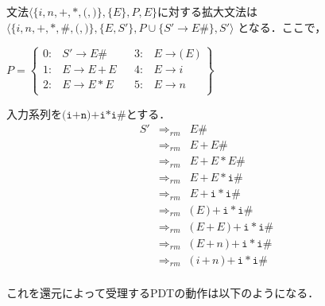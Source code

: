 \documentclass[dvipdfmx,a4j]{jbook}
\begin{document}
\begin{Exmp}
  文法$\langle\{i,n,\texttt{+},\texttt{*},\texttt{(},\texttt{)}\},\{E\},P,E\}$に対する拡大文法は
  $\langle\{i,n,\texttt{+},\texttt{*},\texttt{\#},\texttt{(},\texttt{)}\},\{E,S'\},P\cup\{S'\rightarrow E\texttt{\#}\},S'\rangle$
  となる．ここで，
  
  $P=\left\{\begin{array}{rlcrl}
    0: & S'\rightarrow E\texttt{\#} & & 3: & E\rightarrow \texttt{(}\,E\,\texttt{)}\\
    1: & E\rightarrow E\,\texttt{+}\,E & & 4: & E\rightarrow i\\
    2: & E\rightarrow E\,\texttt{*}\,E & & 5: & E\rightarrow n\\
  \end{array}\right\}$

  入力系列を$\texttt{(i+n)+i*i\#}$とする．
  \[\begin{array}{rcl}
    S' & \Rightarrow_{rm} & E\texttt{\#}\\
       & \Rightarrow_{rm} & E\,\texttt{+}\,E\texttt{\#}\\
       & \Rightarrow_{rm} & E\,\texttt{+}\,E\,\texttt{*}\,E\texttt{\#}\\
       & \Rightarrow_{rm} & E\,\texttt{+}\,E\,\texttt{*}\,\texttt{i}\texttt{\#}\\
       & \Rightarrow_{rm} & E\,\texttt{+}\,\texttt{i}\,\texttt{*}\,\texttt{i}\texttt{\#}\\
       & \Rightarrow_{rm} & \texttt{(}\,E\,\texttt{)}\,\texttt{+}\,\texttt{i}\,\texttt{*}\,\texttt{i}\texttt{\#}\\
       & \Rightarrow_{rm} & \texttt{(}\,E\,\texttt{+}\,E\,\texttt{)}\,\texttt{+}\,\texttt{i}\,\texttt{*}\,\texttt{i}\texttt{\#}\\
       & \Rightarrow_{rm} & \texttt{(}\,E\,\texttt{+}\,n\,\texttt{)}\,\texttt{+}\,\texttt{i}\,\texttt{*}\,\texttt{i}\texttt{\#}\\
       & \Rightarrow_{rm} & \texttt{(}\,i\,\texttt{+}\,n\,\texttt{)}\,\texttt{+}\,\texttt{i}\,\texttt{*}\,\texttt{i}\texttt{\#}\\
      \end{array}\]

これを還元によって受理するPDTの動作は以下のようになる．


\end{Exmp}
\end{document}
